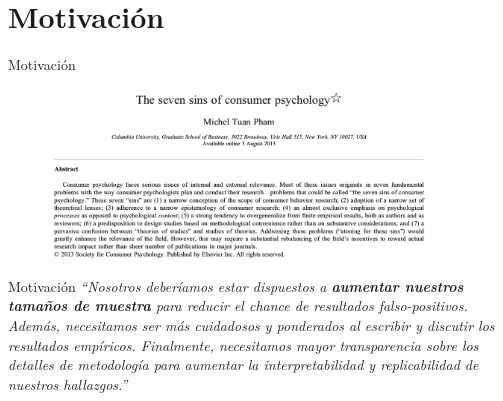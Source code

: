 \documentclass{beamer}
\begin{document}

\section{Motivación}
\begin{frame}{Motivación}
\begin{figure}
\centering
\includegraphics[width=0.9\textwidth]{Pham.png}
\end{figure}    
\end{frame}

\begin{frame}{Motivación}
\textit{``Nosotros deberíamos estar dispuestos a  \textbf{aumentar nuestros tamaños de muestra} para reducir el chance de resultados falso-positivos. Además, necesitamos ser más cuidadosos y ponderados al escribir y discutir los resultados empíricos. Finalmente, necesitamos mayor transparencia sobre los detalles de metodología para aumentar la interpretabilidad y replicabilidad de nuestros hallazgos.''}
\cite[p. 419]{Pham2013}
\end{frame}
\end{document}
